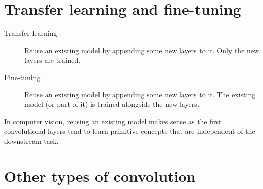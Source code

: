 \section{Transfer learning and fine-tuning}

\begin{description}
    \item[Transfer learning] 
        Reuse an existing model by appending some new layers to it.
        Only the new layers are trained.

    \item[Fine-tuning] 
        Reuse an existing model by appending some new layers to it.
        The existing model (or part of it) is trained alongside the new layers.
\end{description}

\begin{remark}
    In computer vision, reusing an existing model makes sense as 
    the first convolutional layers tend to learn primitive concepts that are independent of the downstream task.
\end{remark}



\section{Other types of convolution}

